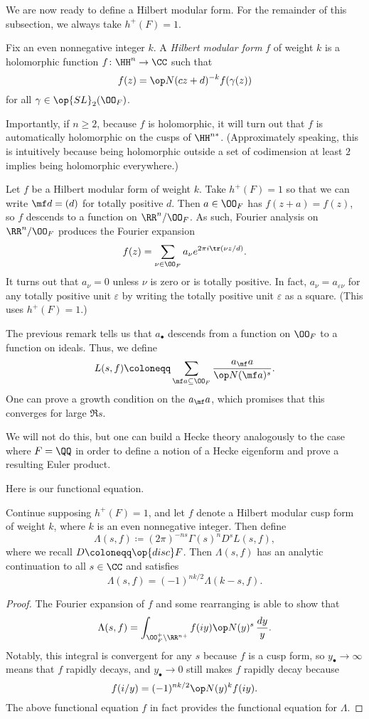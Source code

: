 \documentclass{article}
\begin{document}
We are now ready to define a Hilbert modular form. For the remainder of this subsection, we always take $h^+(F)=1$.
\begin{definition}
	Fix an even nonnegative integer $k$. A \textit{Hilbert modular form} $f$ of weight $k$ is a holomorphic function $f\colon\HH^n\to\CC$ such that
	\[f(z)=\op N(cz+d)^{-k}f(\gamma(z))\]
	for all $\gamma\in\op{SL}_2(\OO_F)$.
\end{definition}
Importantly, if $n\ge2$, because $f$ is holomorphic, it will turn out that $f$ is automatically holomorphic on the cusps of $\HH^{n*}$. (Approximately speaking, this is intuitively because being holomorphic outside a set of codimension at least $2$ implies being holomorphic everywhere.)
\begin{remark}
	Let $f$ be a Hilbert modular form of weight $k$. Take $h^+(F)=1$ so that we can write $\mf d=(d)$ for totally positive $d$. Then $a\in\OO_F$ has $f(z+a)=f(z)$, so $f$ descends to a function on $\RR^n/\OO_F$. As such, Fourier analysis on $\RR^n/\OO_F$ produces the Fourier expansion
	\[f(z)=\sum_{\nu\in\OO_F}a_\nu e^{2\pi i\tr(\nu z/d)}.\]
	It turns out that $a_\nu=0$ unless $\nu$ is zero or is totally positive. In fact, $a_\nu=a_{\varepsilon\nu}$ for any totally positive unit $\varepsilon$ by writing the totally positive unit $\varepsilon$ as a square. (This uses $h^+(F)=1$.)
\end{remark}
The previous remark tells us that $a_\bullet$ descends from a function on $\OO_F$ to a function on ideals. Thus, we define
\[L(s,f)\coloneqq\sum_{\mf a\subseteq\OO_F}\frac{a_\mf a}{\op N(\mf a)^s}.\]
One can prove a growth condition on the $a_\mf a$, which promises that this converges for large $\Re s$.
\begin{remark}
	We will not do this, but one can build a Hecke theory analogously to the case where $F=\QQ$ in order to define a notion of a Hecke eigenform and prove a resulting Euler product.
\end{remark}
Here is our functional equation.
\begin{definition}
	Continue supposing $h^+(F)=1$, and let $f$ denote a Hilbert modular cusp form of weight $k$, where $k$ is an even nonnegative integer. Then define
	\[\Lambda(s,f)\coloneqq(2\pi)^{-ns}\Gamma(s)^nD^sL(s,f),\]
	where we recall $D\coloneqq\op{disc}F$. Then $\Lambda(s,f)$ has an analytic continuation to all $s\in\CC$ and satisfies
	\[\Lambda(s,f)=(-1)^{nk/2}\Lambda(k-s,f).\]
\end{definition}
\begin{proof}
	The Fourier expansion of $f$ and some rearranging is able to show that
	\[\Lambda(s,f)=\int_{\OO_F^+\backslash\RR^{n+}}f(iy)\op N(y)^s\,\frac{dy}y.\]
	Notably, this integral is convergent for any $s$ because $f$ is a cusp form, so $y_\bullet\to\infty$ means that $f$ rapidly decays, and $y_\bullet\to0$ still makes $f$ rapidly decay because
	\[f(i/y)=(-1)^{nk/2}\op N(y)^kf(iy).\]
	The above functional equation $f$ in fact provides the functional equation for $\Lambda$.
\end{proof}
\end{document}
